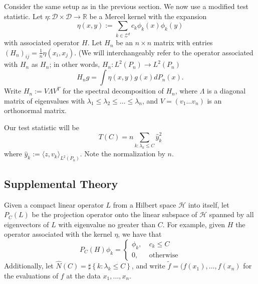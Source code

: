 \documentclass{article}
\newcommand{\Reals}{\mathbb{R}}
\newcommand{\set}[1]{\left\{#1\right\}}
\newcommand{\dotp}[2]{\langle #1, #2 \rangle}
\newcommand{\1}{\mathbb{I}}
\theoremstyle{alden}
\theoremstyle{aldenthm}
\theoremstyle{definition}
\theoremstyle{remark}
\begin{document}
Consider the same setup as in the previous section. We now use a modified test statistic. Let $\eta: \mathcal{D} \times \mathcal{D} \to \Reals$ be a Mercel kernel with the expansion
\begin{equation*}
\eta(x,y) := \sum_{k \in \mathcal{Z}^d} c_k \phi_k(x) \phi_k(y)
\end{equation*}
with associated operator $H$. Let $H_n$ be an $n \times n$ matrix with entries $(H_n)_{ij} = \frac{1}{n} \eta(x_i,x_j)$. (We will interchangeably refer to the operator associated with $H_n$ as $H_n$; in other words, $H_n: L^2(P_n) \to L^2(P_n)$
\begin{equation*}
H_ng = \int \eta(x,y) g(x) dP_n(x).
\end{equation*}
Write $H_n := V\Lambda V^T$ for the spectral decomposition of $H_n$, where $\Lambda$ is a diagonal matrix of eigenvalues with $\lambda_1 \leq \lambda_2 \leq \ldots \leq \lambda_n$, and $V = (v_1 \ldots v_n)$ is an orthonormal matrix.

Our test statistic will be
\begin{equation*}
T(C) = n \sum_{k:\lambda_k \leq C} \widehat{y}_k^2
\end{equation*}
where $\widehat{y}_k := \dotp{z}{v_k}_{L^2(P_n)}$. Note the normalization by $n$.

\subsection{Supplemental Theory}

Given a compact linear operator $L$ from a Hilbert space $\mathcal{H}$ into itself, let $P_C(L)$ be the projection operator onto the linear subspace of $\mathcal{H}$ spanned by all eigenvectors of $L$ with eigenvalue no greater than $C$. For example, given $H$ the operator associated with the kernel $\eta$, we have that
\begin{equation*}
P_C(H) \phi_k =
\begin{cases}
\phi_k,& ~ c_k \leq C \\
0,& ~ \text{otherwise}
\end{cases}
\end{equation*}
Additionally, let $\widehat{N}(C) = \sharp\set{k: \lambda_k \leq C}$, and write $\widetilde{f} = (f(x_1),\ldots,f(x_n)$ for the evaluations of $f$ at the data $x_1, \ldots, x_n$.  
\end{document}
